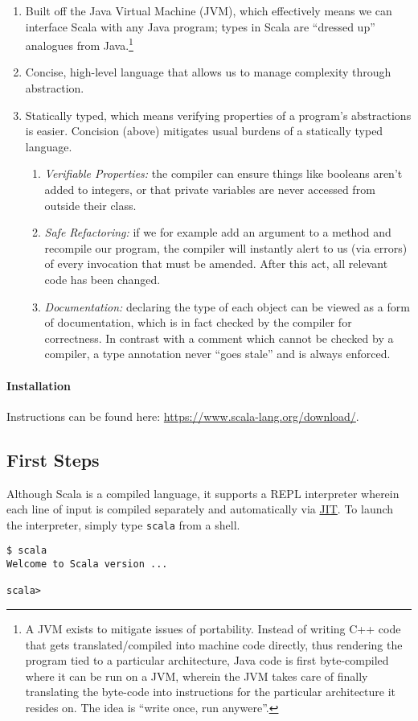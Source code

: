 \documentclass[12pt,letterpaper,twoside]{article}
\begin{document}
\vspace{-1.5ex}
\begin{enumerate}   
  \item Built off the 
    Java Virtual Machine (JVM), which effectively means we can interface Scala
    with any Java program; types in Scala are ``dressed up'' analogues from Java.\footnote{A JVM exists to
      mitigate issues of portability. Instead of writing C++ code that gets
      translated/compiled into machine code directly, thus rendering the program tied to a particular architecture,
      Java code is first byte-compiled where it can be run on a JVM, wherein the JVM takes care of finally translating
      the byte-code into instructions for the particular architecture it resides on. The idea is ``write once, run anywere''.}
\item  Concise, high-level language that allows us to manage
complexity through abstraction.
\item Statically typed, which means verifying properties of a program's abstractions
  is easier. Concision (above) mitigates usual burdens of a statically
  typed language.
  \begin{enumerate}   \item \emph{Verifiable Properties:} the compiler can ensure things like 
    booleans aren't added to integers,
    or that private variables are never accessed from outside their class.
  \item \emph{Safe Refactoring:} if we for example add an argument to a method and
    recompile our program, the compiler will instantly alert to us (via errors)
    of every invocation that must be amended. After this act, all relevant code has been changed.
  \item \emph{Documentation:} declaring the type of each object can be viewed
    as a form of documentation, which is in fact checked by the compiler for
    correctness. In contrast with a comment which cannot be checked by a compiler,
    a type annotation never ``goes stale'' and is always enforced.   \end{enumerate} \end{enumerate}

\paragraph{Installation} Instructions can be found here:
\url{https://www.scala-lang.org/download/}.

\subsection{First Steps}
Although Scala is a compiled language, it supports a REPL interpreter
wherein each line of input is compiled separately and automatically via 
\href{https://www.ibm.com/support/knowledgecenter/en/SSYKE2_8.0.0/com.ibm.java.vm.80.doc/docs/jit_overview.html}{JIT}. 
To launch the
interpreter, simply type \texttt{scala} from a shell.
\begin{verbatim}
$ scala
Welcome to Scala version ...

scala> \end{verbatim}
\end{document}
